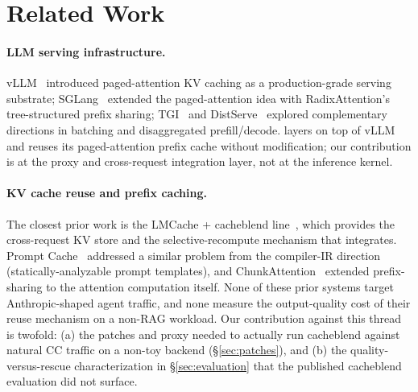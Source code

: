 
\section{Related Work}
\label{sec:related}

\paragraph{LLM serving infrastructure.}
vLLM~\cite{vllm-sosp} introduced paged-attention KV caching as a
production-grade serving substrate; SGLang~\cite{sglang-paper} extended
the paged-attention idea with RadixAttention's tree-structured prefix
sharing; TGI~\cite{tgi-repo} and DistServe~\cite{distserve-osdi}
explored complementary directions in batching and disaggregated
prefill/decode. \sys{} layers on top of vLLM and reuses its
paged-attention prefix cache without modification; our contribution is
at the proxy and cross-request integration layer, not at the inference
kernel.

\paragraph{KV cache reuse and prefix caching.}
The closest prior work is the LMCache + cacheblend
line~\cite{lmcache-paper, lmcache-cacheblend}, which provides the
cross-request KV store and the selective-recompute mechanism that \sys{}
integrates. Prompt Cache~\cite{promptcache-mlsys} addressed a similar
problem from the compiler-IR direction (statically-analyzable prompt
templates), and ChunkAttention~\cite{chunkattention} extended
prefix-sharing to the attention computation itself. None of these prior
systems target Anthropic-shaped agent traffic, and none measure the
output-quality cost of their reuse mechanism on a non-RAG workload.
Our contribution against this thread is twofold: (a) the patches and
proxy needed to actually run cacheblend against natural CC traffic on a
non-toy backend (\S\ref{sec:patches}), and (b) the quality-versus-rescue
characterization in \S\ref{sec:evaluation} that the published cacheblend
evaluation did not surface.

